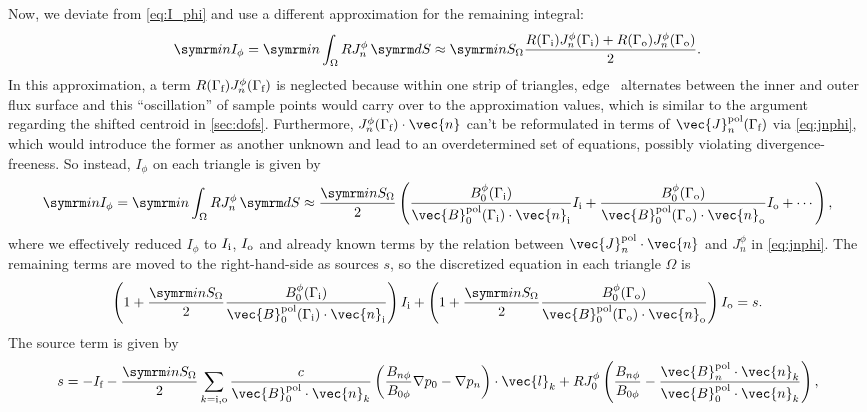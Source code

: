 Now, we deviate from \cref{eq:I_phi} and use a different approximation for the remaining integral:
\begin{gather}
  \im n I_{\phi} = \im n \int_{\Omega} R J_{n}^{\phi} \, \diff S \approx \im n S_{\Omega} \frac{R (\Gamma_{\inw}) J_{n}^{\phi} (\Gamma_{\inw}) + R (\Gamma_{\out}) J_{n}^{\phi} (\Gamma_{\out})}{2}.
\end{gather}
In this approximation, a term $R (\Gamma_{\fs}) J_{n}^{\phi} (\Gamma_{\fs})$ is neglected because within one strip of triangles, edge \fs\ alternates between the inner and outer flux surface and this \enquote{oscillation} of sample points would carry over to the approximation values, which is similar to the argument regarding the shifted centroid in \cref{sec:dofs}. Furthermore, $J_{n}^{\phi} (\Gamma_{\fs}) \cdot \vec{n}$ can't be reformulated in terms of $\vec{J}_{n}^{\pol} (\Gamma_{\fs})$ via \cref{eq:jnphi}, which would introduce the former as another unknown and lead to an overdetermined set of equations, possibly violating divergence-freeness. So instead, $I_{\phi}$ on each triangle is given by
\begin{gather}
  \im n I_{\phi} = \im n \int_{\Omega} R J_{n}^{\phi} \, \diff S \approx \frac{\im n S_{\Omega}}{2} \left ( \frac{B_{0}^{\phi} (\Gamma_{\inw})}{\vec{B}_{0}^{\pol} (\Gamma_{\inw}) \cdot \vec{n}_{\inw}} I_{\inw} + \frac{B_{0}^{\phi} (\Gamma_{\out})}{\vec{B}_{0}^{\pol} (\Gamma_{\out}) \cdot \vec{n}_{\out}} I_{\out} + \dotsb \right ),
\end{gather}
where we effectively reduced $I_{\phi}$ to $I_{\textrm{i}}$, $I_{\textrm{o}}$ and already known terms by the relation between $\vec{J}_{n}^{\pol} \cdot \vec{n}$ and $J_{n}^{\phi}$ in \cref{eq:jnphi}. The remaining terms are moved to the right-hand-side as sources $s$, so the discretized equation in each triangle $\Omega$ is
\begin{gather}
  \left ( 1 + \frac{\im n S_{\Omega}}{2} \frac{B_{0}^{\phi} (\Gamma_{\inw})}{\vec{B}_{0}^{\pol} (\Gamma_{\inw}) \cdot \vec{n}_{\inw}} \right ) I_{\inw} + \left ( 1 + \frac{\im n S_{\Omega}}{2} \frac{B_{0}^{\phi} (\Gamma_{\out})}{\vec{B}_{0}^{\pol} (\Gamma_{\out}) \cdot \vec{n}_{\out}} \right ) I_{\out} = s. \label{eq:Ii-Io}
\end{gather}
The source term is given by
\begin{gather}
  s = -I_{\fs} - \frac{\im n S_{\Omega}}{2} \sum_{k = \inw, \out} \frac{c}{\vec{B}_{0}^{\pol} \cdot \vec{n}_{k}} \left ( \frac{B_{n \phi}}{B_{0 \phi}} \grad p_{0} - \grad p_{n} \right ) \cdot \vec{l}_{k} + R J_{0}^{\phi} \left ( \frac{B_{n \phi}}{B_{0 \phi}} - \frac{\vec{B}_{n}^{\pol} \cdot \vec{n}_{k}}{\vec{B}_{0}^{\pol} \cdot \vec{n}_{k}} \right ),
\end{gather}
